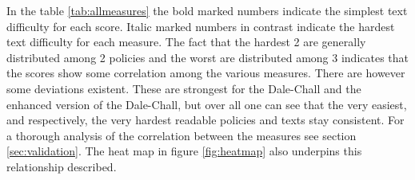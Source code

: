 \documentclass[runningheads,a4paper]{llncs}
\begin{document}
In the table \ref{tab:allmeasures} the bold marked numbers indicate the simplest text difficulty for each score. Italic marked numbers in contrast indicate the hardest text difficulty for each measure. The fact that the hardest 2 are generally distributed among 2 policies and the worst are distributed among 3 indicates that the scores show some correlation among the various measures. There are however some deviations existent. These are strongest for the Dale-Chall and the enhanced version of the Dale-Chall, but over all one can see that the very easiest, and respectively, the very hardest readable policies and texts stay consistent. For a thorough analysis of the correlation between the measures see section \ref{sec:validation}. The heat map in figure \ref{fig:heatmap} also underpins this relationship described. 
\end{document}
